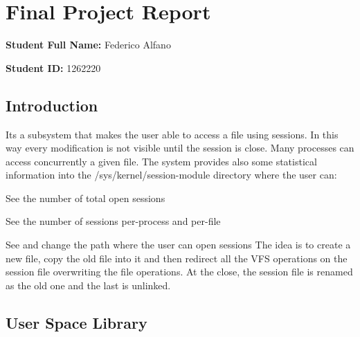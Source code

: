 \section*{Final Project Report}

{\bfseries Student Full Name\+:} Federico Alfano

{\bfseries Student ID\+:} 1262220

\subsection*{Introduction}

It\textquotesingle{}s a subsystem that makes the user able to access a file using sessions. In this way every modification is not visible until the session is close. Many processes can access concurrently a given file. The system provides also some statistical information into the /sys/kernel/session-\/module directory where the user can\+:
\begin{DoxyItemize}
\item See the number of total open sessions
\item See the number of sessions per-\/process and per-\/file
\item See and change the path where the user can open sessions The idea is to create a new file, copy the old file into it and then redirect all the V\+FS operations on the session file overwriting the file operations. At the close, the session file is renamed as the old one and the last is unlinked.
\end{DoxyItemize}

\subsection*{User Space Library}

